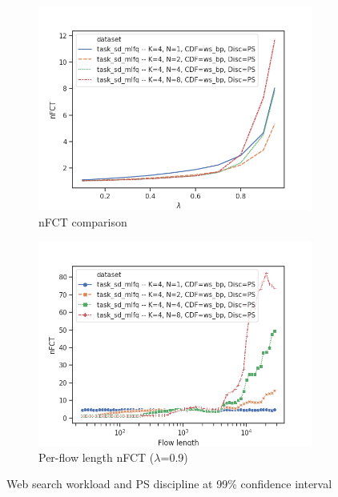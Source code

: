 \begin{figure}
	\centering
	\begin{subfigure}{.5\textwidth}
		\centering
		\includegraphics[width=0.99\textwidth]{Chapter3/Figures/sd_mlfq_k4_comparison.png}
		\caption{nFCT comparison}
		\label{fig:sdmlfq-variable-N-fct}
	\end{subfigure}%
	\hfill
	\begin{subfigure}{.5\textwidth}
		\centering
		\includegraphics[width=0.99\textwidth]{Chapter3/Figures/sd_mlfq_k4_detailed.png}
		\caption{Per-flow length nFCT ($\lambda$=0.9)}
		\label{fig:sdmlfq-variable-N-fct-detailed}
	\end{subfigure}
	\caption{Web search workload and PS discipline at 99\% confidence interval}
	\label{fig:sdmlfq-variable-N}
\end{figure}
